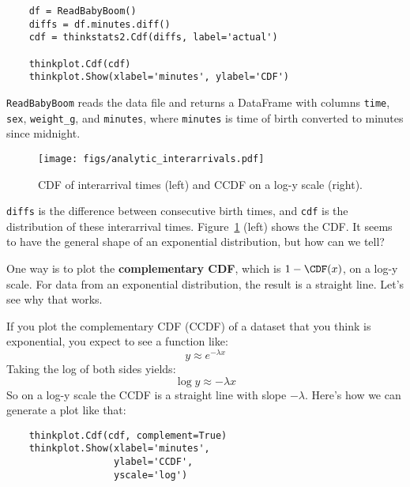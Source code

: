 \documentclass[12pt]{book}
\begin{document}
\begin{verbatim}
    df = ReadBabyBoom()
    diffs = df.minutes.diff()
    cdf = thinkstats2.Cdf(diffs, label='actual')

    thinkplot.Cdf(cdf)
    thinkplot.Show(xlabel='minutes', ylabel='CDF')
\end{verbatim}

{\tt ReadBabyBoom} reads the data file and returns a DataFrame
with columns {\tt time}, {\tt sex}, \verb"weight_g", and {\tt minutes},
where {\tt minutes} is time of birth converted to minutes since
midnight.

\begin{figure}
\centerline{\texttt{[image: figs/analytic\_interarrivals.pdf]}}
\caption{CDF of interarrival times (left) and CCDF on a log-y scale (right).}
\label{analytic_interarrival_cdf}
\end{figure}


{\tt diffs} is the difference between consecutive birth times, and
{\tt cdf} is the distribution of these interarrival times.
Figure~\ref{analytic_interarrival_cdf} (left) shows the CDF.  It seems
to have the general shape of an exponential distribution, but how can
we tell?

One way is to plot the {\bf complementary CDF}, which is $1 - \CDF(x)$,
on a log-y scale.  For data from an exponential distribution, the
result is a straight line.  Let's see why that works.
  

If you plot the complementary CDF (CCDF) of a dataset that you think is
exponential, you expect to see a function like:
%
\[ y \approx e^{-\lambda x} \]
%
Taking the log of both sides yields:
%
\[ \log y \approx -\lambda x\]
%
So on a log-y scale the CCDF is a straight line
with slope $-\lambda$.  Here's how we can generate a plot like that:


\begin{verbatim}
    thinkplot.Cdf(cdf, complement=True)
    thinkplot.Show(xlabel='minutes',
                   ylabel='CCDF',
                   yscale='log')
\end{verbatim}
\end{document}
